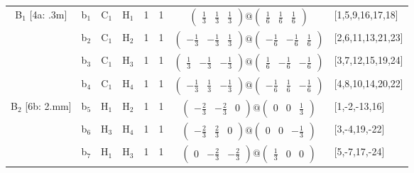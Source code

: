 \documentclass[fleqn,10pt,landscape]{article}
\begin{document}
\begin{itemize}
\begin{center}
\begin{longtable}{cc|cc|c|c|c|l}
B$_{1}$ [4a: .3m] & b$_{1}$ & C$_{1}$ & H$_{1}$ & 1 & 1 & $\begin{pmatrix} \frac{1}{3} & \frac{1}{3} & \frac{1}{3} \end{pmatrix}@\begin{pmatrix} \frac{1}{6} & \frac{1}{6} & \frac{1}{6} \end{pmatrix}$ & [1,5,9,16,17,18] \\
& b$_{2}$ & C$_{1}$ & H$_{2}$ & 1 & 1 & $\begin{pmatrix} - \frac{1}{3} & - \frac{1}{3} & \frac{1}{3} \end{pmatrix}@\begin{pmatrix} - \frac{1}{6} & - \frac{1}{6} & \frac{1}{6} \end{pmatrix}$ & [2,6,11,13,21,23] \\
& b$_{3}$ & C$_{1}$ & H$_{3}$ & 1 & 1 & $\begin{pmatrix} \frac{1}{3} & - \frac{1}{3} & - \frac{1}{3} \end{pmatrix}@\begin{pmatrix} \frac{1}{6} & - \frac{1}{6} & - \frac{1}{6} \end{pmatrix}$ & [3,7,12,15,19,24] \\
& b$_{4}$ & C$_{1}$ & H$_{4}$ & 1 & 1 & $\begin{pmatrix} - \frac{1}{3} & \frac{1}{3} & - \frac{1}{3} \end{pmatrix}@\begin{pmatrix} - \frac{1}{6} & \frac{1}{6} & - \frac{1}{6} \end{pmatrix}$ & [4,8,10,14,20,22] \\ \hline
B$_{2}$ [6b: 2.mm] & b$_{5}$ & H$_{1}$ & H$_{2}$ & 1 & 1 & $\begin{pmatrix} - \frac{2}{3} & - \frac{2}{3} & 0 \end{pmatrix}@\begin{pmatrix} 0 & 0 & \frac{1}{3} \end{pmatrix}$ & [1,-2,-13,16] \\
& b$_{6}$ & H$_{3}$ & H$_{4}$ & 1 & 1 & $\begin{pmatrix} - \frac{2}{3} & \frac{2}{3} & 0 \end{pmatrix}@\begin{pmatrix} 0 & 0 & - \frac{1}{3} \end{pmatrix}$ & [3,-4,19,-22] \\
& b$_{7}$ & H$_{1}$ & H$_{3}$ & 1 & 1 & $\begin{pmatrix} 0 & - \frac{2}{3} & - \frac{2}{3} \end{pmatrix}@\begin{pmatrix} \frac{1}{3} & 0 & 0 \end{pmatrix}$ & [5,-7,17,-24] \\

\end{longtable}
\end{center}
\end{itemize}
\end{document}
